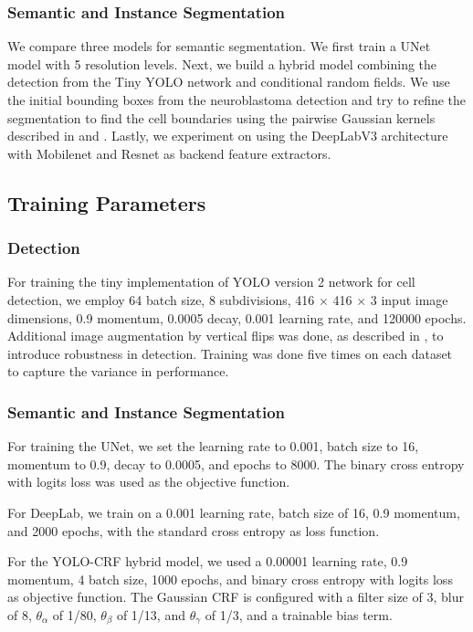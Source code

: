 \documentclass[journal]{IEEEtran}
\begin{document}
\subsubsection{Semantic and Instance Segmentation}
We compare three models for semantic segmentation. We first train a UNet model with 5 resolution levels. Next, we build a hybrid model combining the detection from the Tiny YOLO network and conditional random fields. We use the initial bounding boxes from the neuroblastoma detection and try to refine the segmentation to find the cell boundaries using the pairwise Gaussian kernels described in \cite{NIPS2011_4296} and \cite{Teichmann2018ConvolutionalCF}. Lastly, we experiment on using the DeepLabV3 architecture with Mobilenet and Resnet as backend feature extractors.
\subsection{Training Parameters}
\subsubsection{Detection}
For training the tiny implementation of YOLO version 2 network for cell detection, we employ 64 batch size, 8 subdivisions, 416 $\times$ 416 $\times$ 3 input image dimensions, 0.9 momentum, 0.0005 decay, 0.001 learning rate, and 120000 epochs. Additional image augmentation by vertical flips was done, as described in \cite{Waithe544833}, to introduce robustness in detection. Training was done five times on each dataset to capture the variance in performance.
\subsubsection{Semantic and Instance Segmentation}
For training the UNet, we set the learning rate to 0.001, batch size to 16, momentum to 0.9, decay to 0.0005, and epochs to 8000. The binary cross entropy with logits loss was used as the objective function.

For DeepLab, we train on a 0.001 learning rate, batch size of 16, 0.9 momentum, and 2000 epochs, with the standard cross entropy as loss function.

For the YOLO-CRF hybrid model, we used a 0.00001 learning rate, 0.9 momentum, 4 batch size, 1000 epochs, and binary cross entropy with logits loss as objective function. The Gaussian CRF is configured with a filter size of 3, blur of 8, $\theta_\alpha$ of 1/80, $\theta_\beta$ of 1/13, and $\theta_\gamma$ of 1/3, and a trainable bias term.
\end{document}
